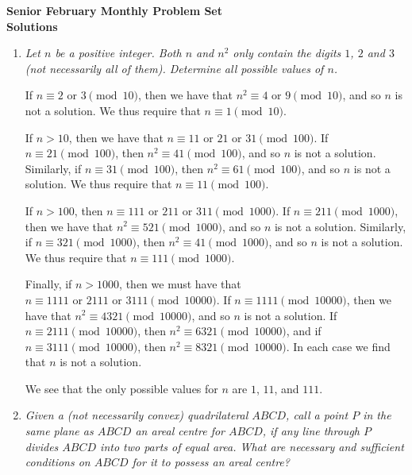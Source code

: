 \documentclass{article}
\begin{document}
\begin{center}
\textbf{\Large Senior February Monthly Problem Set}
\\ \vspace{1em}
\textbf{\large Solutions}
\end{center}

\begin{enumerate}[1.]

\item %
{\itshape Let $n$ be a positive integer. Both $n$ and $n^2$ only contain the digits $1$, $2$ and $3$ (not necessarily all of them). Determine all possible values of $n$.}

If $n \equiv 2 \text{ or } 3 \pmod{10}$, then we have that $n^2 \equiv 4 \text{ or } 9 \pmod{10}$, and so $n$ is not a solution. We thus require that $n \equiv 1 \pmod{10}$.

If $n > 10$, then we have that $n \equiv 11 \text{ or } 21 \text{ or } 31 \pmod{100}$. If $n \equiv 21 \pmod{100}$, then $n^2 \equiv 41 \pmod{100}$, and so $n$ is not a solution. Similarly, if $n \equiv 31 \pmod{100}$, then $n^2 \equiv 61 \pmod{100}$, and so $n$ is not a solution. We thus require that $n \equiv 11 \pmod{100}$.

If $n > 100$, then $n \equiv 111 \text{ or } 211 \text{ or } 311 \pmod{1000}$. If $n \equiv 211 \pmod{1000}$, then we have that $n^2 \equiv 521 \pmod{1000}$, and so $n$ is not a solution. Similarly, if $n \equiv 321 \pmod{1000}$, then $n^2 \equiv 41 \pmod{1000}$, and so $n$ is not a solution. We thus require that $n \equiv 111 \pmod{1000}$.

Finally, if $n > 1000$, then we must have that $n \equiv 1111 \text{ or } 2111 \text{ or } 3111 \pmod{10000}$. If $n \equiv 1111 \pmod{10000}$, then we have that $n^2 \equiv 4321 \pmod{10000}$, and so $n$ is not a solution. If $n \equiv 2111 \pmod{10000}$, then $n^2 \equiv 6321 \pmod{10000}$, and if $n \equiv 3111 \pmod{10000}$, then $n^2 \equiv 8321 \pmod{10000}$. In each case we find that $n$ is not a solution.

We see that the only possible values for $n$ are $1$, $11$, and $111$.


\vspace{6pt}
\item %
{\itshape Given a (not necessarily convex) quadrilateral $ABCD$, call a point $P$ in the same plane as $ABCD$ an \emph{areal centre} for $ABCD$, if any line through $P$ divides $ABCD$ into two parts of equal area. What are necessary and sufficient conditions on $ABCD$ for it to possess an areal centre?}



\end{enumerate}
\end{document}

